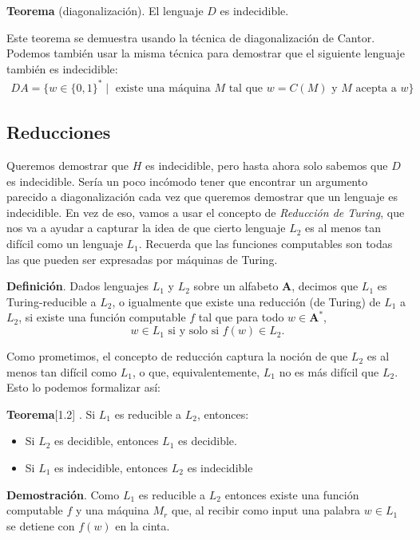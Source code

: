 \documentclass[12pt]{article}
\newcommand{\A}{\textbf{A}}
\begin{document}
\medskip
\noindent
\textbf{Teorema} (diagonalización). El lenguaje $D$ es indecidible.

Este teorema se demuestra usando la técnica de diagonalización de Cantor.  Podemos también usar la misma técnica para demostrar que el siguiente lenguaje también es indecidible: 
\begin{multline*}
DA = \{w \in \{0,1\}^* \mid \text{ existe una máquina } M \text{ tal que } w = C(M) \text{ y } M \text{ acepta a } w\}
\end{multline*}


\subsection{Reducciones}


Queremos demostrar que $H$ es indecidible, pero hasta ahora solo sabemos que $D$ es indecidible. 
Sería un poco incómodo tener que encontrar un argumento parecido a diagonalización cada vez que queremos demostrar que un lenguaje es indecidible. 
En vez de eso, vamos a usar el concepto de 
\emph{Reducción de Turing}, que nos va a ayudar a capturar la idea de que cierto lenguaje $L_2$ es al menos tan difícil como un lenguaje $L_1$.
Recuerda que las funciones computables son todas las que pueden ser expresadas por máquinas de Turing. 

\medskip
\noindent
\textbf{Definición}. Dados lenguajes $L_1$ y $L_2$ sobre un alfabeto $\A$, decimos que $L_1$ es Turing-reducible a $L_2$, 
o igualmente que existe una reducción (de Turing) de $L_1$ a $L_2$, si existe una función computable $f$ tal que para todo $w \in \A^*$, 
$$w \in L_1 \text{ si y solo si } f(w) \in L_2.$$ 

Como prometimos, el concepto de reducción captura la noción de que $L_2$ es al menos tan difícil como $L_1$, o que, equivalentemente, 
$L_1$ no es más difícil que $L_2$. Esto lo podemos formalizar así: 

 \medskip
\noindent
\textbf{Teorema}[1.2]
\label{teo-reduccion}. Si $L_1$ es reducible a $L_2$, entonces:
\begin{itemize}
\item Si $L_2$ es decidible, entonces $L_1$ es decidible. 
\item Si $L_1$ es indecidible, entonces $L_2$ es indecidible
\end{itemize}

\medskip
\noindent
\textbf{Demostración}. Como $L_1$ es reducible a $L_2$ entonces existe una función computable $f$ y una 
máquina $M_r$ que, al recibir 
como input una palabra $w \in L_1$ se detiene con $f(w)$ en la cinta. 
\end{document}
